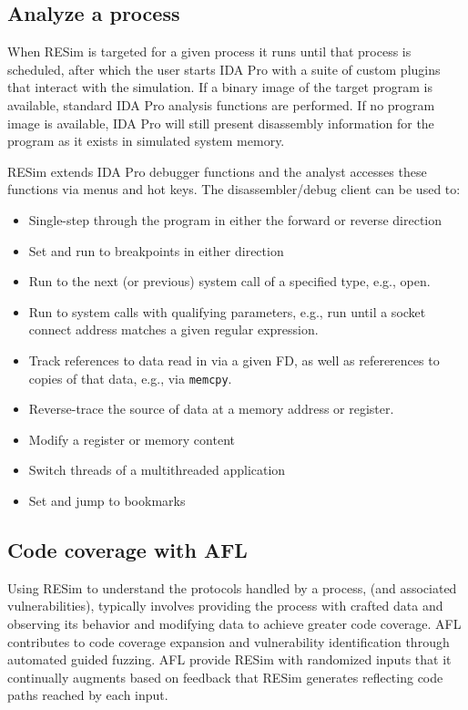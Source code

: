 \documentclass[titlepage]{article}
\begin{document}
\subsection{Analyze a process}
When RESim is targeted for a given process it runs until that process is scheduled, after which the user starts IDA Pro with a suite of custom plugins that interact with the simulation.  If a binary image of the target program is available, standard IDA Pro analysis functions are performed.  If no program image is available, IDA Pro will still present disassembly information for the program as it exists in simulated system memory.  

RESim extends IDA Pro debugger functions and the analyst accesses these functions via menus and hot keys.   The disassembler/debug client can be used to:
\begin{itemize}
\item Single-step through the program in either the forward or reverse direction
\item Set and run to breakpoints in either direction
\item Run to the next (or previous) system call of a specified type, e.g., open.
\item Run to system calls with qualifying parameters, e.g., run until a socket connect address matches a given regular expression.
\item Track references to data read in via a given FD, as well as refererences to copies of that data, e.g., via {\tt memcpy}.
\item Reverse-trace the source of data at a memory address or register.
\item Modify a register or memory content
\item Switch threads of a multithreaded application
\item Set and jump to bookmarks
\end{itemize}

\subsection{Code coverage with AFL}
Using RESim to understand the protocols handled by a process, (and associated vulnerabilities),  typically involves providing the process with
crafted data and observing its behavior and modifying data to achieve greater code coverage.  AFL contributes to code coverage expansion
and vulnerability identification through automated guided fuzzing.  AFL provide RESim with randomized inputs that 
it continually augments based on feedback that RESim generates reflecting code paths reached by each input.  
\end{document}
